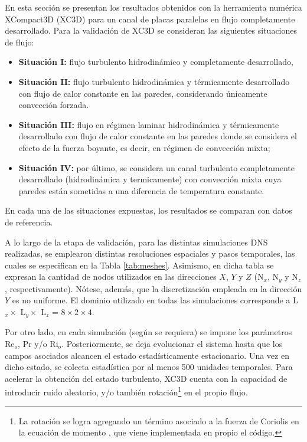 En esta sección se presentan los resultados obtenidos con la herramienta numérica XCompact3D (XC3D) para un canal de placas paralelas en flujo completamente desarrollado. Para la validación de XC3D se consideran las siguientes situaciones de flujo: 

\begin{itemize}

\item \textbf{Situación I:} flujo turbulento hidrodinámico y completamente desarrollado,

\item \textbf{Situación II:} flujo turbulento hidrodinámica y térmicamente desarrollado con flujo de calor constante en las paredes, considerando únicamente convección forzada.

\item \textbf{Situación III:} flujo en régimen laminar hidrodinámica y térmicamente desarrollado con flujo de calor constante en las paredes donde se considera el efecto de la fuerza boyante, es decir, en régimen de convección mixta; 

\item \textbf{Situación IV:} por último, se considera un canal turbulento completamente desarrollado (hidrodinámica y termicamente) con convección mixta cuya paredes están sometidas a una diferencia de temperatura constante. 

\end{itemize}
En cada una de las situaciones expuestas, los resultados se comparan con datos de referencia.

A lo largo de la etapa de validación, para las distintas simulaciones DNS realizadas, se emplearon distintas resoluciones espaciales y pasos temporales, las cuales se especifican en la Tabla \ref{tab:meshes}. Asimismo, en dicha tabla se expresan la cantidad de nodos utilizados en las direcciones $X$, $Y$ y $Z$ (N$_x$, N$_y$ y N$_z$, respectivamente). Nótese, además, que la discretización empleada en la dirección $Y$ es no uniforme. El dominio utilizado en todas las simulaciones corresponde a L$_x \times$ L$_y \times$ L$_z$ = $8 \times 2 \times 4$.

Por otro lado, en cada simulación (según se requiera) se impone los parámetros Re$_o$, Pr y/o Ri$_o$. Posteriormente, se deja evolucionar el sistema hasta que los campos asociados alcancen el estado estadísticamente estacionario. Una vez en dicho estado, se colecta estadística por al menos 500 unidades temporales. Para acelerar la obtención del estado turbulento, XC3D cuenta con la capacidad de introducir  ruido aleatorio, y/o también rotación\footnote{La rotación se logra agregando un término asociado a la fuerza de Coriolis en la ecuación de momento \cite{lamballais2014}, que viene implementada en propio el código.} en el propio flujo. 

